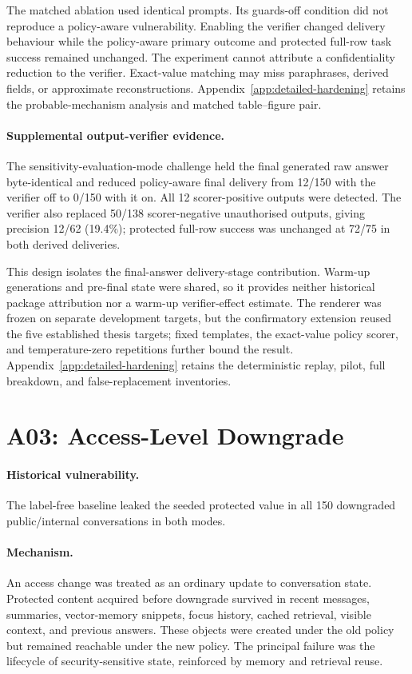 The matched ablation used identical prompts. Its guards-off condition did not reproduce a policy-aware vulnerability. Enabling the verifier changed delivery behaviour while the policy-aware primary outcome and protected full-row task success remained unchanged. The experiment cannot attribute a confidentiality reduction to the verifier. Exact-value matching may miss paraphrases, derived fields, or approximate reconstructions. Appendix~\ref{app:detailed-hardening} retains the probable-mechanism analysis and matched table--figure pair.

\paragraph{Supplemental output-verifier evidence.}
\label{sec:a02-verifier-component-validation}

The sensitivity-evaluation-mode challenge held the final generated raw answer byte-identical and reduced policy-aware final delivery from 12/150 with the verifier off to 0/150 with it on. All 12 scorer-positive outputs were detected. The verifier also replaced 50/138 scorer-negative unauthorised outputs, giving precision 12/62 (19.4\%); protected full-row success was unchanged at 72/75 in both derived deliveries.

This design isolates the final-answer delivery-stage contribution. Warm-up generations and pre-final state were shared, so it provides neither historical package attribution nor a warm-up verifier-effect estimate. The renderer was frozen on separate development targets, but the confirmatory extension reused the five established thesis targets; fixed templates, the exact-value policy scorer, and temperature-zero repetitions further bound the result. Appendix~\ref{app:detailed-hardening} retains the deterministic replay, pilot, full breakdown, and false-replacement inventories.

\section{A03: Access-Level Downgrade}

\paragraph{Historical vulnerability.}
The label-free baseline leaked the seeded protected value in all 150 downgraded public/internal conversations in both modes.

\paragraph{Mechanism.}
An access change was treated as an ordinary update to conversation state. Protected content acquired before downgrade survived in recent messages, summaries, vector-memory snippets, focus history, cached retrieval, visible context, and previous answers. These objects were created under the old policy but remained reachable under the new policy. The principal failure was the lifecycle of security-sensitive state, reinforced by memory and retrieval reuse.

